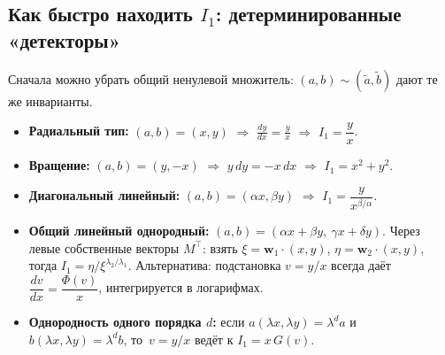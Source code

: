 \subsection{Как быстро находить $I_1$: детерминированные «детекторы»}\label{sec:pde-first-invariant}

Сначала можно убрать общий ненулевой множитель: $(a,b)\sim (\tilde a,\tilde b)$ дают те же инварианты.

\begin{itemize}
\item \textbf{Радиальный тип:} $(a,b)=(x,y)$ $\Rightarrow$ $\displaystyle \frac{dy}{dx}=\frac{y}{x}$ $\Rightarrow$ $I_1=\dfrac{y}{x}$.

\item \textbf{Вращение:} $(a,b)=(y,-x)$ $\Rightarrow$ $y\,dy=-x\,dx$ $\Rightarrow$ $I_1=x^2+y^2$.

\item \textbf{Диагональный линейный:} $(a,b)=(\alpha x,\beta y)$ $\Rightarrow$ $I_1=\dfrac{y}{x^{\beta/\alpha}}$.

\item \textbf{Общий линейный однородный:} $(a,b)=(\alpha x+\beta y,\ \gamma x+\delta y)$.
Через левые собственные векторы $M^\top$: взять $\xi=\mathbf w_1\!\cdot\!(x,y)$, $\eta=\mathbf w_2\!\cdot\!(x,y)$, тогда
$I_1=\eta/\xi^{\lambda_2/\lambda_1}$.
Альтернатива: подстановка $v=y/x$ всегда даёт $\dfrac{dv}{dx}=\dfrac{\Phi(v)}{x}$, интегрируется в логарифмах.

\item \textbf{Однородность одного порядка $d$:} если $a(\lambda x,\lambda y)=\lambda^d a$ и $b(\lambda x,\lambda y)=\lambda^d b$, то
$\,v=y/x$ ведёт к $I_1=x\,G(v)$.
\end{itemize}
